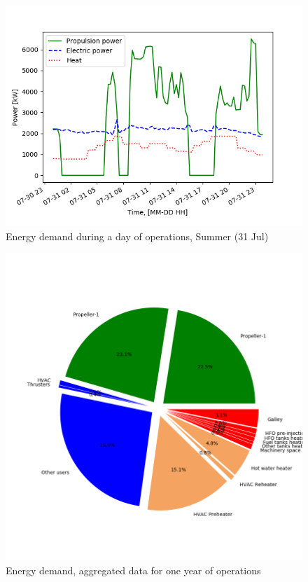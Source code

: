 \documentclass[preprint,12pt]{elsarticle}
\begin{document}
\begin{figure}[htbp]
	\centering
	\includegraphics[width=0.9\linewidth]{Figures/Demand_vs_time_S}
	\caption{Energy demand during a day of operations, Summer (31 Jul)}
	\label{fig:Demand_vs_time_S}
\end{figure}

\begin{figure}[htbp]
	\centering
	\includegraphics[width=0.9\linewidth]{Figures/Pie_EnergyDemand}
	\caption{Energy demand, aggregated data for one year of operations}
	\label{fig:Pie_EnergyDemand}
\end{figure}
\end{document}
